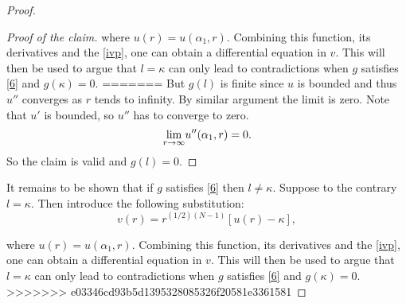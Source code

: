 \begin{lemma}
\begin{proof}
\begin{proof}[Proof of the claim]
where $u(r)=u(\alpha_1,r)$. Combining this function, its derivatives and the \eqref{ivp}, one can obtain a differential equation in $v$. This will then be used to argue that $l=\kappa$ can only lead to contradictions when $g$ satisfies \eqref{6} and $g(\kappa)=0$.
=======
But $g(l)$ is finite since $u$ is bounded and thus $u''$ converges as $r$ tends to infinity. By similar argument the limit is zero. Note that $u'$ is bounded, so $u''$ has to converge to zero. $$\underset{r\to\infty}{\lim} u''(\alpha_1,r)=0.$$ So the claim is valid and $g(l)=0$.\end{proof}  

It remains to be shown that if $g$ satisfies \eqref{6} then $l\neq\kappa.$ Suppose to the contrary $l=\kappa$. Then introduce the following substitution: 
$$v(r)=r^{(1/2)(N-1)}\left[u(r)-\kappa\right],$$ 

where $u(r)=u(\alpha_1,r)$. Combining this function, its derivatives and the \eqref{ivp}, one can obtain a differential equation in $v$. This will then be used to argue that $l=\kappa$ can only lead to contradictions when $g$ satisfies \eqref{6} and $g(\kappa)=0$. 
>>>>>>> e03346cd93b5d1395328085326f20581e3361581


\end{proof}
\end{lemma}
